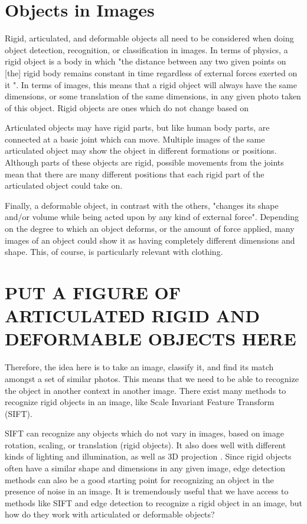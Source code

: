 \documentclass[12pt]{article} %
\begin{document}
\section{Objects in Images}

	Rigid, articulated, and deformable objects all need to be considered when doing object detection, recognition, or classification in images. In terms of physics, a rigid object is a body in which "the distance between any two given points on [the] rigid body remains constant in time regardless of external forces exerted on it "\cite{RigidBodyWiki}. In terms of images, this means that a rigid object will always have the same dimensions, or some translation of the same dimensions, in any given photo taken of this object. Rigid objects are ones which do not change based on 

	Articulated objects may have rigid parts, but like human body parts, are connected at a basic joint which can move\cite{szeliski2010computer}. Multiple images of the same articulated object may show the object in different formations or positions. Although parts of these objects are rigid, possible movements from the joints mean that there are many different positions that each rigid part of the articulated object could take on. 

	Finally, a deformable object, in contrast with the others, "changes its shape and/or volume while being acted upon by any kind of external force"\cite{wolfram}. Depending on the degree to which an object deforms, or the amount of force applied, many images of an object could show it as having completely different dimensions and shape. This, of course, is particularly relevant with clothing. 
	
\section{PUT A FIGURE OF ARTICULATED RIGID AND DEFORMABLE OBJECTS HERE}
	
	Therefore, the idea here is to take an image, classify it, and find its match amongst a set of similar photos. This means that we need to be able to recognize the object in another context in another image. There exist many methods to recognize rigid objects in an image, like Scale Invariant Feature Transform (SIFT). 

	SIFT can recognize any objects which do not vary in images, based on image rotation, scaling, or translation (rigid objects). It also does well with different kinds of lighting and illumination, as well as 3D projection \cite{lowe1999object}. Since rigid objects often have a similar shape and dimensions in any given image, edge detection methods can also be a good starting point for recognizing an object in the presence of noise in an image. It is tremendously useful that we have access to methods like SIFT and edge detection to recognize a rigid object in an image, but how do they work with articulated or deformable objects? 
\end{document}

